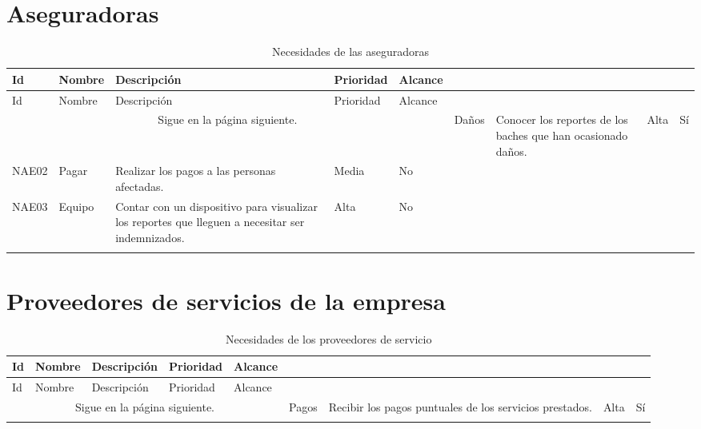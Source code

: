 \section {Aseguradoras}
\begin{longtable}{|m{1.5cm}|m{3cm}|m{5cm}|m{2cm}| m{2cm}|}\rowcolor[HTML]{3531FF} 
        {\color[HTML]{FFFFFF} Id} &{\color[HTML]{FFFFFF}Nombre} & {\color[HTML]{FFFFFF} Descripción} & {\color[HTML]{FFFFFF}Prioridad} & {\color[HTML]{FFFFFF}Alcance}\\
        \hline
        \endfirsthead
        \hline
        Id & Nombre & Descripción & Prioridad & Alcance  \\
        \hline 
        \endhead
        \multicolumn{5}{c}{Sigue en la página siguiente.}
        \endfoot
        \endlastfoot
        
        NAE01 & Daños & Conocer los reportes de los baches que han ocasionado daños.& Alta  & Sí \\ \hline
        
        NAE02 & Pagar & Realizar los pagos a las personas afectadas. & Media & No \\\hline
        
        NAE03 & Equipo & Contar con un dispositivo para visualizar los reportes que lleguen a necesitar ser indemnizados. & Alta & No \\
        \hline
    \caption{Necesidades de las aseguradoras}
    \label{tab:NAEs}
\end{longtable}

\section {Proveedores de servicios de la empresa}
\begin{longtable}{|m{1.5cm}|m{3cm}|m{5cm}|m{2cm}| m{2cm}|}\rowcolor[HTML]{3531FF} 
        {\color[HTML]{FFFFFF} Id} &{\color[HTML]{FFFFFF}Nombre} & {\color[HTML]{FFFFFF} Descripción} & {\color[HTML]{FFFFFF}Prioridad} & {\color[HTML]{FFFFFF}Alcance}\\
        \hline
        \endfirsthead
        \hline
        Id & Nombre & Descripción & Prioridad & Alcance  \\
        \hline 
        \endhead
        \multicolumn{5}{c}{Sigue en la página siguiente.}
        \endfoot
        \endlastfoot
        
        NPDS01 & Pagos & Recibir los pagos puntuales de los servicios prestados. & Alta & Sí \\
        \hline
    \caption{Necesidades de los proveedores de servicio}
    \label{tab:NPSS}
\end{longtable}